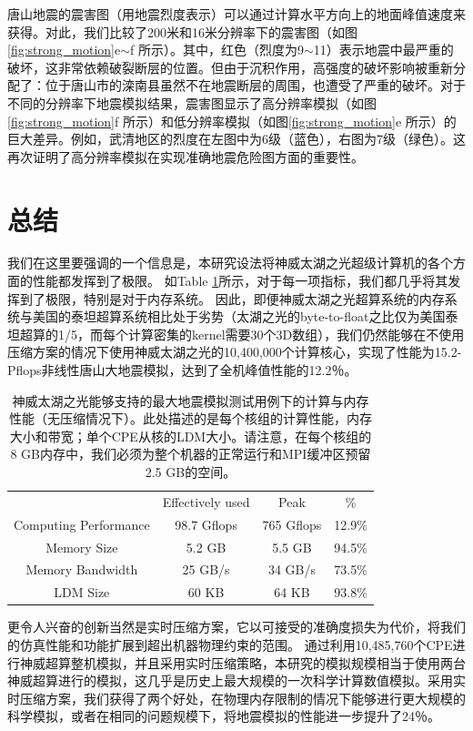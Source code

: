 \documentclass[degree=doctor]{thuthesis}
\begin{document}
唐山地震的震害图（用地震烈度表示）可以通过计算水平方向上的地面峰值速度来获得。对此，我们比较了200米和16米分辨率下的震害图（如图\ref{fig:strong_motion}e$\sim$f 所示）。其中，红色（烈度为9$\sim$11）表示地震中最严重的破坏，这非常依赖破裂断层的位置。但由于沉积作用，高强度的破坏影响被重新分配了：位于唐山市的滦南县虽然不在地震断层的周围，也遭受了严重的破坏。对于不同的分辨率下地震模拟结果，震害图显示了高分辨率模拟（如图\ref{fig:strong_motion}f 所示）和低分辨率模拟（如图\ref{fig:strong_motion}e 所示）的巨大差异。例如，武清地区的烈度在左图中为6级（蓝色），右图为7级（绿色）。这再次证明了高分辨率模拟在实现准确地震危险图方面的重要性。

\section{总结}

我们在这里要强调的一个信息是，本研究设法将神威太湖之光超级计算机的各个方面的性能都发挥到了极限。 如Table \ref{tb:push-limit}所示，对于每一项指标，我们都几乎将其发挥到了极限，特别是对于内存系统。 因此，即便神威太湖之光超算系统的内存系统与美国的泰坦超算系统相比处于劣势（太湖之光的byte-to-float之比仅为美国泰坦超算的1/5，而每个计算密集的kernel需要30个3D数组），我们仍然能够在不使用压缩方案的情况下使用神威太湖之光的10,400,000个计算核心，实现了性能为15.2-Pflops非线性唐山大地震模拟，达到了全机峰值性能的12.2％。

\begin{table}[!t]
\caption{
神威太湖之光能够支持的最大地震模拟测试用例下的计算与内存性能（无压缩情况下）。此处描述的是每个核组的计算性能，内存大小和带宽；单个CPE从核的LDM大小。请注意，在每个核组的8 GB内存中，我们必须为整个机器的正常运行和MPI缓冲区预留2.5 GB的空间。}
\label{tb:push-limit}
\centering
\begin{tabular}{cccc}
\hline\hline
  & Effectively used & Peak & \% \\

  Computing Performance & 98.7 Gflops & 765 Gflops & 12.9\% \\
  Memory Size & 5.2 GB & 5.5 GB & 94.5\% \\
  Memory Bandwidth & 25 GB/s & 34 GB/s & 73.5\% \\
  LDM Size & 60 KB & 64 KB & 93.8\% \\\hline
\hline
\end{tabular}
\end{table}

更令人兴奋的创新当然是实时压缩方案，它以可接受的准确度损失为代价，将我们的仿真性能和功能扩展到超出机器物理约束的范围。 通过利用10,485,760个CPE进行神威超算整机模拟，并且采用实时压缩策略，本研究的模拟规模相当于使用两台神威超算进行的模拟，这几乎是历史上最大规模的一次科学计算数值模拟。采用实时压缩方案，我们获得了两个好处，在物理内存限制的情况下能够进行更大规模的科学模拟，或者在相同的问题规模下，将地震模拟的性能进一步提升了24％。
\end{document}
